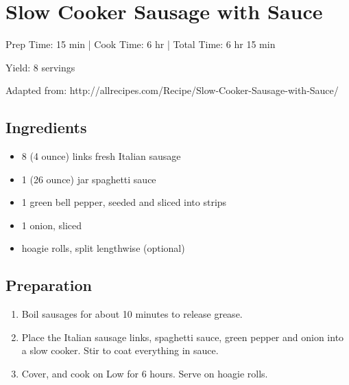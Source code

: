 \section{Slow Cooker Sausage with Sauce}

\begin{center}
Prep Time: 15 min |
Cook Time: 6 hr |
Total Time: 6 hr 15 min

\noindent Yield: 8 servings

\vspace{1em}

Adapted from: http://allrecipes.com/Recipe/Slow-Cooker-Sausage-with-Sauce/
\end{center}

\subsection{Ingredients}
\begin{multicols}{2}
\begin{itemize}
    \item 8 (4 ounce) links fresh Italian sausage
    \item 1 (26 ounce) jar spaghetti sauce
    \item 1 green bell pepper, seeded and sliced into strips
    \item 1 onion, sliced 
    \item hoagie rolls, split lengthwise (optional)
\end{itemize}
\end{multicols}

\subsection{Preparation}
\begin{enumerate}
    \item Boil sausages for about 10 minutes to release grease.
    \item Place the Italian sausage links, spaghetti sauce, green pepper and onion into a slow cooker. Stir to coat everything in sauce.
    \item Cover, and cook on Low for 6 hours. Serve on hoagie rolls.
\end{enumerate}
